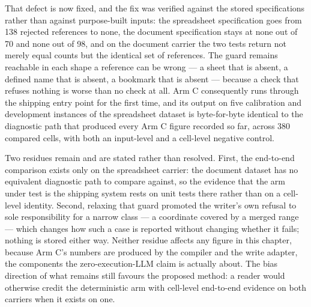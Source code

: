 That defect is now fixed, and the fix was verified against the stored specifications rather than
against purpose-built inputs: the spreadsheet specification goes from 138 rejected references to
none, the document specification stays at none out of 70 and none out of 98, and on the document
carrier the two tests return not merely equal counts but the identical set of references. The
guard remains reachable in each shape a reference can be wrong --- a sheet that is absent, a
defined name that is absent, a bookmark that is absent --- because a check that refuses nothing
is worse than no check at all. Arm C consequently runs through the shipping entry point for the
first time, and its output on five calibration and development instances of the spreadsheet
dataset is byte-for-byte identical to the diagnostic path that produced every Arm C figure
recorded so far, across 380 compared cells, with both an input-level and a cell-level negative
control.

Two residues remain and are stated rather than resolved. First, the end-to-end comparison exists
only on the spreadsheet carrier: the document dataset has no equivalent diagnostic path to
compare against, so the evidence that the arm under test is the shipping system rests on unit
tests there rather than on a cell-level identity. Second, relaxing that guard promoted the writer's
own refusal to sole responsibility for a narrow class --- a coordinate covered by a merged range
--- which changes how such a case is reported without changing whether it fails; nothing is
stored either way. Neither residue affects any figure in this chapter, because Arm C's numbers
are produced by the compiler and the write adapter, the components the zero-execution-LLM claim
is actually about. The bias direction of what remains still favours the proposed method: a reader
would otherwise credit the deterministic arm with cell-level end-to-end evidence on both carriers
when it exists on one.

